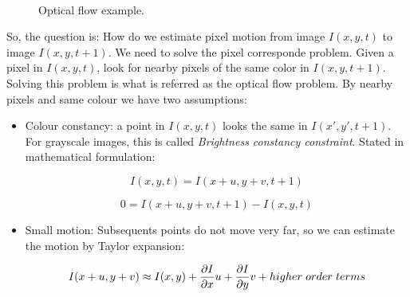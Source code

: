 \documentclass[12pt, a4paper, titlepage,twoside,openright]{article}
\begin{document}
\begin{figure}[H]
		
\centering

\\


\caption{Optical flow example.}
\label{refArchiteOF}
\end{figure}

So, the question is: How do we estimate pixel motion from image $I(x,y,t)$ to image $I(x,y,t+1)$. We need to solve the pixel corresponde problem. Given a pixel in $I(x,y,t)$, look for nearby pixels of the same color in $I(x,y,t+1)$. Solving this problem is what is referred as the optical flow problem. By nearby pixels and same colour we have two assumptions:

\begin{itemize}

\item Colour constancy: a point in $I(x,y,t)$ looks the same in $I(x',y',t+1)$. For grayscale images, this is called \textit{Brightness constancy constraint}. Stated in mathematical formulation:

$$ I(x,y,t) = I(x+u,y+v,t+1) $$

$$ 0 = I(x+u,y+v,t+1)-I(x,y,t)  $$

\item Small motion: Subsequents points do not move very far, so we can estimate the motion by Taylor expansion: 

$$ I(x+u,y+v) 	\approx  I(x,y) + \dfrac{ \partial I}{\partial x}u +\dfrac{ \partial I}{\partial y}v + higher \hspace{0.1cm} order \hspace{0.1cm} terms $$


\end{itemize}
 
\end{document}
